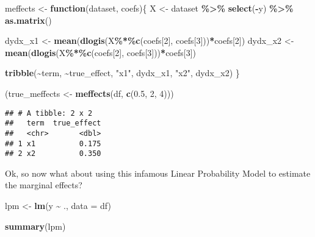\documentclass[
]{article}
\newenvironment{Shaded}{\begin{snugshade}}{\end{snugshade}}
\newcommand{\ControlFlowTok}[1]{\textcolor[rgb]{0.13,0.29,0.53}{\textbf{#1}}}
\newcommand{\DataTypeTok}[1]{\textcolor[rgb]{0.13,0.29,0.53}{#1}}
\newcommand{\DecValTok}[1]{\textcolor[rgb]{0.00,0.00,0.81}{#1}}
\newcommand{\FloatTok}[1]{\textcolor[rgb]{0.00,0.00,0.81}{#1}}
\newcommand{\KeywordTok}[1]{\textcolor[rgb]{0.13,0.29,0.53}{\textbf{#1}}}
\newcommand{\NormalTok}[1]{#1}
\newcommand{\OperatorTok}[1]{\textcolor[rgb]{0.81,0.36,0.00}{\textbf{#1}}}
\newcommand{\StringTok}[1]{\textcolor[rgb]{0.31,0.60,0.02}{#1}}
\begin{document}
\begin{Shaded}
\begin{Highlighting}[]
\NormalTok{meffects \textless{}{-}}\StringTok{ }\ControlFlowTok{function}\NormalTok{(dataset, coefs)\{}
\NormalTok{  X \textless{}{-}}\StringTok{ }\NormalTok{dataset }\OperatorTok{\%\textgreater{}\%}\StringTok{ }
\StringTok{  }\KeywordTok{select}\NormalTok{(}\OperatorTok{{-}}\NormalTok{y) }\OperatorTok{\%\textgreater{}\%}\StringTok{ }
\StringTok{  }\KeywordTok{as.matrix}\NormalTok{()}
  
\NormalTok{  dydx\_x1 \textless{}{-}}\StringTok{ }\KeywordTok{mean}\NormalTok{(}\KeywordTok{dlogis}\NormalTok{(X}\OperatorTok{\%*\%}\KeywordTok{c}\NormalTok{(coefs[}\DecValTok{2}\NormalTok{], coefs[}\DecValTok{3}\NormalTok{]))}\OperatorTok{*}\NormalTok{coefs[}\DecValTok{2}\NormalTok{])}
\NormalTok{  dydx\_x2 \textless{}{-}}\StringTok{ }\KeywordTok{mean}\NormalTok{(}\KeywordTok{dlogis}\NormalTok{(X}\OperatorTok{\%*\%}\KeywordTok{c}\NormalTok{(coefs[}\DecValTok{2}\NormalTok{], coefs[}\DecValTok{3}\NormalTok{]))}\OperatorTok{*}\NormalTok{coefs[}\DecValTok{3}\NormalTok{])}
  
  \KeywordTok{tribble}\NormalTok{(}\OperatorTok{\textasciitilde{}}\NormalTok{term, }\OperatorTok{\textasciitilde{}}\NormalTok{true\_effect,}
          \StringTok{"x1"}\NormalTok{, dydx\_x1,}
          \StringTok{"x2"}\NormalTok{, dydx\_x2)}
\NormalTok{\}}

\NormalTok{(true\_meffects \textless{}{-}}\StringTok{ }\KeywordTok{meffects}\NormalTok{(df, }\KeywordTok{c}\NormalTok{(}\FloatTok{0.5}\NormalTok{, }\DecValTok{2}\NormalTok{, }\DecValTok{4}\NormalTok{)))}
\end{Highlighting}
\end{Shaded}

\begin{verbatim}
## # A tibble: 2 x 2
##   term  true_effect
##   <chr>       <dbl>
## 1 x1          0.175
## 2 x2          0.350
\end{verbatim}

Ok, so now what about using this infamous Linear Probability Model to estimate the marginal effects?

\begin{Shaded}
\begin{Highlighting}[]
\NormalTok{lpm \textless{}{-}}\StringTok{ }\KeywordTok{lm}\NormalTok{(y }\OperatorTok{\textasciitilde{}}\StringTok{ }\NormalTok{., }\DataTypeTok{data =}\NormalTok{ df)}

\KeywordTok{summary}\NormalTok{(lpm)}
\end{Highlighting}
\end{Shaded}
\end{document}
